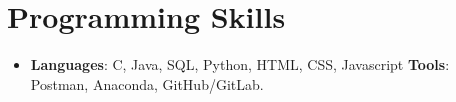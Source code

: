 \documentclass[letterpaper,11pt]{article}
\newcommand{\resumeSubHeadingListStart}{\begin{itemize}[leftmargin=*]}
\newcommand{\resumeSubHeadingListEnd}{\end{itemize}}
\begin{document}
%
\section{Programming Skills}
  \resumeSubHeadingListStart
    \item{
      \textbf{Languages}{: C, Java, SQL, Python, HTML, CSS, Javascript}
      \hfill
      \textbf{Tools}{: Postman, Anaconda, GitHub/GitLab.}
    }
  \resumeSubHeadingListEnd


\end{document}
